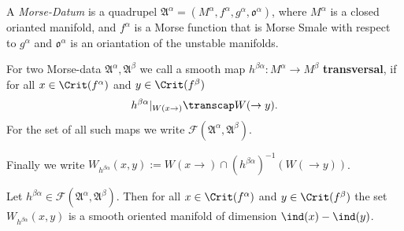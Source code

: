 
\begin{definition}
	A \textit{Morse-Datum} is a quadrupel $\mathfrak{A}^{\alpha}=(M^{\alpha},f^{\alpha},g^{\alpha},\mathfrak{o}^{\alpha})$, where $M^{\alpha}$ is a closed orianted manifold, and $f^{\alpha}$ is a Morse function that is Morse Smale with respect to $g^{\alpha}$ and $\mathfrak{o}^{\alpha}$ is an oriantation of the unstable manifolds. 
\end{definition}
\begin{definition}
	For two Morse-data $\mathfrak{A}^{\alpha},\mathfrak{A}^{\beta}$ we call a smooth map $h^{\beta\alpha}:M^{\alpha}\to M^{\beta}$ \textbf{transversal}, if for all $x\in \Crit(f^{\alpha})$ and $y\in\Crit(f^{\beta})$
	\begin{align}
		h^{\beta\alpha}|_{W(x\to)}\transcap W(\to y).
	\end{align} For the set of all such maps we write $\mathcal{F}(\mathfrak{A}^{\alpha},\mathfrak{A}^{\beta})$. 
	
	Finally we write $W_{h^{\beta\alpha}}(x,y):=W(x \to)\cap ({h^{\beta\alpha}})^{-1}(W(\to y))$.
\end{definition}
\begin{prop}
	Let $h^{\beta\alpha}\in \mathcal{F}(\mathfrak{A}^{\alpha},\mathfrak{A}^{\beta})$. Then for all $x\in \Crit(f^{\alpha})$ and $y\in\Crit(f^{\beta})$ the set $W_{h^{\beta\alpha}}(x,y)$ is a smooth oriented manifold of dimension $\ind(x)-\ind(y)$.
\end{prop}
